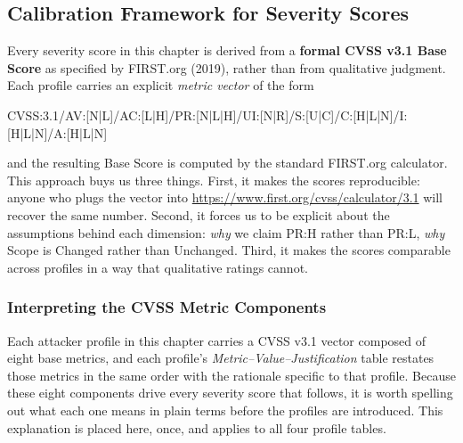 \documentclass[12pt,a4paper]{report}
\begin{document}
\subsection{Calibration Framework for Severity Scores}
\label{ch3:sec:cvss-framework}

Every severity score in this chapter is derived from a \textbf{formal CVSS
v3.1 Base Score} as specified by FIRST.org (2019), rather than from qualitative
judgment. Each profile carries an explicit \emph{metric vector} of the form

\begin{center}
{\ttfamily\scriptsize CVSS:3.1/AV:[N|L]/AC:[L|H]/PR:[N|L|H]/UI:[N|R]/S:[U|C]/C:[H|L|N]/I:[H|L|N]/A:[H|L|N]}
\end{center}

and the resulting Base Score is computed by the standard FIRST.org
calculator. This approach buys us three things. First, it makes the
scores reproducible: anyone who plugs the vector into
\url{https://www.first.org/cvss/calculator/3.1} will recover the same
number. Second, it forces us to be explicit about the assumptions behind
each dimension: \emph{why} we claim PR:H rather than PR:L, \emph{why}
Scope is Changed rather than Unchanged. Third, it makes the scores
comparable across profiles in a way that qualitative ratings cannot.

\subsubsection{Interpreting the CVSS Metric Components}
\label{ch3:sec:cvss-metrics-explained}

Each attacker profile in this chapter carries a CVSS v3.1 vector composed
of eight base metrics, and each profile's \emph{Metric--Value--Justification}
table restates those metrics in the same order with the rationale specific
to that profile. Because these eight components drive every severity score
that follows, it is worth spelling out what each one means in plain terms
before the profiles are introduced. This explanation is placed here, once,
and applies to all four profile tables.
\end{document}
